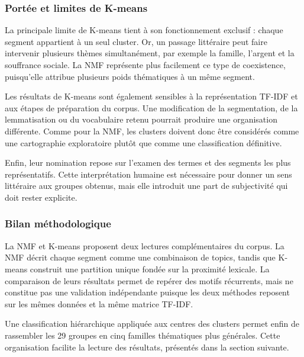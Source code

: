 \subsubsection{Portée et limites de K-means}

La principale limite de K-means tient à son fonctionnement exclusif : chaque segment appartient à un seul cluster. Or, un passage littéraire peut faire intervenir plusieurs thèmes simultanément, par exemple la famille, l'argent et la souffrance sociale. La NMF représente plus facilement ce type de coexistence, puisqu'elle attribue plusieurs poids thématiques à un même segment.

Les résultats de K-means sont également sensibles à la représentation TF-IDF et aux étapes de préparation du corpus. Une modification de la segmentation, de la lemmatisation ou du vocabulaire retenu pourrait produire une organisation différente. Comme pour la NMF, les clusters doivent donc être considérés comme une cartographie exploratoire plutôt que comme une classification définitive.

Enfin, leur nomination repose sur l'examen des termes et des segments les plus représentatifs. Cette interprétation humaine est nécessaire pour donner un sens littéraire aux groupes obtenus, mais elle introduit une part de subjectivité qui doit rester explicite.

\subsubsection{Bilan méthodologique}

La NMF et K-means proposent deux lectures complémentaires du corpus. La NMF décrit chaque segment comme une combinaison de topics, tandis que K-means construit une partition unique fondée sur la proximité lexicale. La comparaison de leurs résultats permet de repérer des motifs récurrents, mais ne constitue pas une validation indépendante puisque les deux méthodes reposent sur les mêmes données et la même matrice TF-IDF.

Une classification hiérarchique appliquée aux centres des clusters permet enfin de rassembler les 29 groupes en cinq familles thématiques plus générales. Cette organisation facilite la lecture des résultats, présentés dans la section suivante.